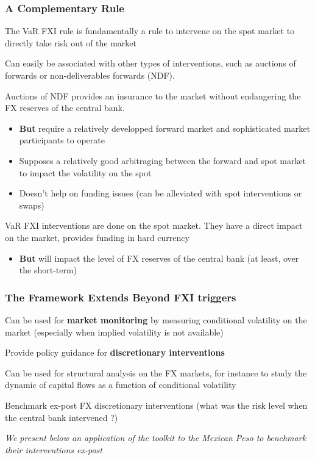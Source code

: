 \documentclass{beamer}
\newenvironment{wideitemize}{\itemize\addtolength{\itemsep}{10pt}}{\enditemize}
\newenvironment{wideenumerate}{\enumerate\addtolength{\itemsep}{10pt}}{\endenumerate}
\begin{document}
\begin{frame}
  \frametitle{A Complementary Rule}
  \begin{wideitemize}
    \item The VaR FXI rule is fundamentally a rule to intervene on the spot market to directly take risk out of the market
    \item Can easily be associated with other types of interventions, such as auctions of forwards or non-deliverables forwards (NDF). 
    \item Auctions of NDF provides an insurance to the market without endangering the FX reserves of the central bank.
      \begin{itemize}
      \item \textbf{But} require a relatively developped forward market and sophisticated market participants to operate
      \item Supposes a relatively good arbitraging between the forward and spot market to impact the volatility on the spot
      \item Doesn't help on funding issues (can be alleviated with spot interventions or swaps)
      \end{itemize}
    \item VaR FXI interventions are done on the spot market. They have a direct impact on the market, provides funding in hard currency
      \begin{itemize}
      \item  \textbf{But} will impact the level of FX reserves of the central bank (at least, over the short-term)
      \end{itemize}
  \end{wideitemize}
\end{frame}


\begin{frame}
  \frametitle{The Framework Extends Beyond FXI triggers}    
  \begin{wideenumerate}
    \item Can be used for \textbf{market monitoring} by measuring conditional volatility on the market (especially when implied volatility is not available)
    \item Provide policy guidance for \textbf{discretionary interventions}
    \item Can be used for structural analysis on the FX markets, for instance to study the dynamic of capital flows as a function of conditional volatility
    \item Benchmark ex-post FX discretionary interventions (what was the risk level when the central bank intervened ?)
    \end{wideenumerate}
    
    \bigskip
    
  \begin{wideitemize}
    \item \emph{We present below an application of the toolkit to the Mexican Peso to benchmark their interventions ex-post}
    \end{wideitemize}
    
\end{frame}
\end{document}
